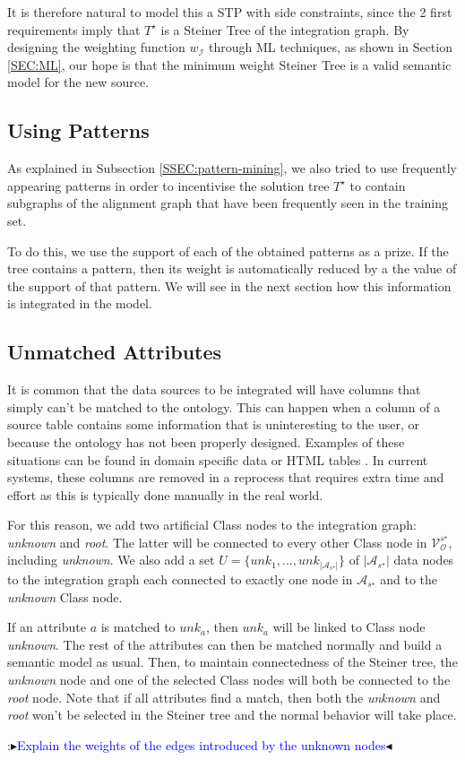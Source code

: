 \documentclass[letterpaper]{article} %
\newcommand{\authornote}[3]{
  {\fbox{\sc 
  #1}:$\blacktriangleright$\textcolor{#2}{\small{#3}}$\blacktriangleleft$}%
}
\newcommand{\ddg}[1]{\authornote{DDG}{blue}{#1}}
\begin{document}
It is therefore natural to model this a STP with side constraints, since the 2 
first requirements imply that $T^\star$ is a Steiner Tree of the integration 
graph. By designing the weighting function $w_\mathcal{I}$ through ML 
techniques, as shown in Section \ref{SEC:ML}, 
our hope is that the minimum weight Steiner Tree is a valid semantic model for 
the new source.


\subsection{Using Patterns}

As explained in Subsection \ref{SSEC:pattern-mining}, we also tried to use 
frequently appearing patterns in order to incentivise the solution tree 
$T^\star$ to contain subgraphs of the alignment graph that have been frequently 
seen in the training set.

To do this, we use the support of each of the obtained patterns as a prize. If 
the tree contains a pattern, then its weight is automatically reduced by a the 
value of the support of that pattern. We will see in the next section how this 
information is integrated in the model.

\subsection{Unmatched Attributes}
It is common that the data sources to be integrated will have columns that 
simply can't be matched to the ontology.
This can happen when a column of a source table contains some information that 
is uninteresting to the user, or because the ontology has not been properly 
designed. 
Examples of these situations can be found in domain specific data 
\cite{Pham:semantic} or HTML tables \cite{Ritze:matching}.
In current systems, these columns are removed in a reprocess that requires extra time and effort as this is typically done manually in the real world.

For this reason, we add two artificial Class nodes to the integration graph:  
\emph{unknown} and \emph{root}. 
The latter will be connected to every other Class node in 
$\mathcal{V}_\mathcal{O}^{s^\star}$, including \emph{unknown}.
We also add a set $U = \{unk_1,...,unk_{|\mathcal{A}_{s^\star}|}\}$ of 
$|\mathcal{A}_{s^\star}|$ data 
nodes to the integration graph each connected to exactly one node in 
$\mathcal{A}_{s^\star}$ and to the \emph{unknown} Class node.  

If an attribute $a$ is matched to $unk_a$, then $unk_a$ will be linked to Class 
node \emph{unknown}. 
The rest of the attributes can then be matched normally 
and build  a semantic model as usual. 
Then, to maintain connectedness of the 
Steiner tree, the \emph{unknown} node and one of the selected Class nodes will 
both be connected to the \emph{root} node. 
Note that if all attributes find a 
match, then both the \emph{unknown} and \emph{root} won't be selected in the 
Steiner tree and the normal behavior will take place.
\ddg{Explain the weights of the edges introduced by the unknown nodes}
\end{document}
